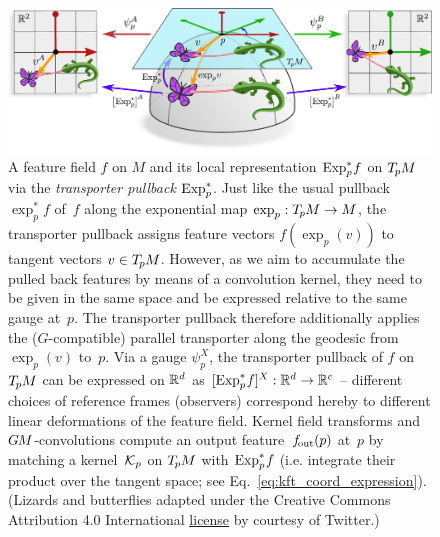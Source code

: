 \begin{figure}
    \centering
    \includegraphics[width=\textwidth]{figures/pullback_field_exp_TpM.pdf}
    \caption{\small
        A feature field $f$ on $M$ and its local representation $\operatorname{Exp}^*_p\mkern-2mu f$ on $T_{\mkern-1.5mu p}\mkern-.5muM$ via the \emph{transporter pullback} $\operatorname{Exp}^*_p$.
        Just like the usual pullback $\exp_p^*f$ of~$f$ along the exponential map $\exp_p: T_{\mkern-1.5mu p}\mkern-.5muM \to M$, the transporter pullback assigns feature vectors $f(\exp_p(v))$ to tangent vectors $v\in T_{\mkern-1.5mu p}\mkern-.5muM$.
        However, as we aim to accumulate the pulled back features by means of a convolution kernel, they need to be given in the same space and be expressed relative to the same gauge at~$p$.
        The transporter pullback therefore additionally applies the ($G$-compatible) parallel transporter along the geodesic from $\exp_p(v)$ to~$p$.
        Via a gauge $\psi_p^X$, the transporter pullback of $f$ on $T_{\mkern-1.5mu p}\mkern-.5muM$ can be expressed on $\mathbb{R}^d$ as $[\operatorname{Exp}^*_p\mkern-2mu f]^X: \mathbb{R}^d \to \mathbb{R}^c$ -- different choices of reference frames (observers) correspond hereby to different linear deformations of the feature field.
        Kernel field transforms and $G\mkern-1.4muM$-convolutions compute an output feature~$f_\textup{\:\!\!out}(p)$ at~$p$ by matching a kernel~$\mathcal{K}_p$ on $T_{\mkern-1.5mu p}\mkern-.5muM$ with $\operatorname{Exp}^*_p\mkern-2mu f$ (i.e. integrate their product over the tangent space; see Eq.~\eqref{eq:kft_coord_expression}).
        { \\
        \color{gray}
        \scriptsize
            (Lizards and butterflies adapted under the Creative Commons Attribution 4.0 International
            \href{https://github.com/twitter/twemoji/blob/gh-pages/LICENSE-GRAPHICS}{\underline{license}}
            by courtesy of Twitter.)
        }
    }
    \label{fig:pullback_field_exp_TpM}
\end{figure}


